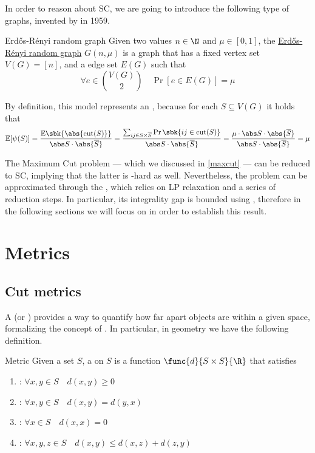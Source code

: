 \documentclass[a4paper, 12pt]{report}
\begin{document}
    In order to reason about SC, we are going to introduce the following type of graphs, invented by \textcite{erdos} in 1959.

    \begin{frameddefn}{Erdős-Rényi random graph}
        Given two values $n \in \N$ and $\mu \in [0, 1]$, the \href{https://en.wikipedia.org/wiki/Erd%C5%91s%E2%80%93R%C3%A9nyi_model}{Erdős-Rényi random graph} $G(n, \mu)$ is a graph that has a fixed vertex set $V(G) = [n]$, and a \tit{probabilistic} edge set $E(G)$ such that $$\forall e \in \binom{V(G)}{2} \quad \Pr[e \in E(G)] = \mu$$
    \end{frameddefn}

    By definition, this model represents an , because for each $S \subseteq V(G)$ it holds that $$ \mathbb E[\psi(S)] = \dfrac{\mathbb E\sbk{\abs{\mathrm{cut}(S)}}}{\abs S \cdot \abs{\overline S}} = \dfrac{\sum_{ij \in S \times \overline S}{\Pr \sbk{ij \in \mathrm{cut}(S)}}}{\abs S \cdot  \abs{\overline S}}= \dfrac{\mu \cdot \abs S \cdot \abs{\overline S}}{\abs S \cdot \abs{\overline S}} = \mu$$

    The Maximum Cut problem --- which we discussed in \cref{maxcut} --- can be reduced to SC, implying that the latter is \NPclass-hard as well. Nevertheless, the problem can be approximated through the  \cite{leightonrao}, which relies on LP relaxation and a series of reduction steps. In particular, its integrality gap is bounded using , therefore in the following sections we will focus on  in order to establish this result.

    \section{Metrics}

    \subsection{Cut metrics}

    A  (or ) provides a way to quantify how far apart objects are within a given space, formalizing the concept of . In particular, in geometry we have the following definition.

    \begin{frameddefn}{Metric}
        Given a set $S$, a  on $S$ is a function $\func{d}{S \times S}{\R}$ that satisfies

        \begin{enumerate}
            \item {}: $\forall x, y \in S \quad d(x,y) \ge 0$
            \item {}: $\forall x, y \in S \quad d(x, y) = d(y, x)$
            \item {}: $\forall x \in S \quad d(x, x) = 0$
            \item {}: $\forall x, y, z \in S \quad d(x,y) \le d(x,z) + d(z, y)$
        \end{enumerate}
    \end{frameddefn}
\end{document}
